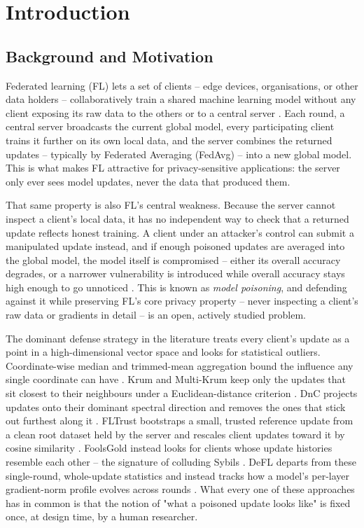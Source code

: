 \chapter{Introduction}
\label{ch:introduction}

\section{Background and Motivation}
\label{sec:intro-background}

Federated learning (FL) lets a set of clients -- edge devices, organisations, or other data holders -- collaboratively train a shared machine learning model without any client exposing its raw data to the others or to a central server \citep{fedavg}. Each round, a central server broadcasts the current global model, every participating client trains it further on its own local data, and the server combines the returned updates -- typically by Federated Averaging (FedAvg) -- into a new global model. This is what makes FL attractive for privacy-sensitive applications: the server only ever sees model updates, never the data that produced them.

That same property is also FL's central weakness. Because the server cannot inspect a client's local data, it has no independent way to check that a returned update reflects honest training. A client under an attacker's control can submit a manipulated update instead, and if enough poisoned updates are averaged into the global model, the model itself is compromised -- either its overall accuracy degrades, or a narrower vulnerability is introduced while overall accuracy stays high enough to go unnoticed \citep{bagdasaryan2020,bhagoji2019}. This is known as \emph{model poisoning}, and defending against it while preserving FL's core privacy property -- never inspecting a client's raw data or gradients in detail -- is an open, actively studied problem.

The dominant defense strategy in the literature treats every client's update as a point in a high-dimensional vector space and looks for statistical outliers. Coordinate-wise median and trimmed-mean aggregation bound the influence any single coordinate can have \citep{byzantine}. Krum and Multi-Krum keep only the updates that sit closest to their neighbours under a Euclidean-distance criterion \citep{krum}. DnC projects updates onto their dominant spectral direction and removes the ones that stick out furthest along it \citep{dnc}. FLTrust bootstraps a small, trusted reference update from a clean root dataset held by the server and rescales client updates toward it by cosine similarity \citep{fltrust}. FoolsGold instead looks for clients whose update histories resemble each other -- the signature of colluding Sybils \citep{foolsgold}. DeFL departs from these single-round, whole-update statistics and instead tracks how a model's per-layer gradient-norm profile evolves across rounds \citep{defl}. What every one of these approaches has in common is that the notion of "what a poisoned update looks like" is fixed once, at design time, by a human researcher.

